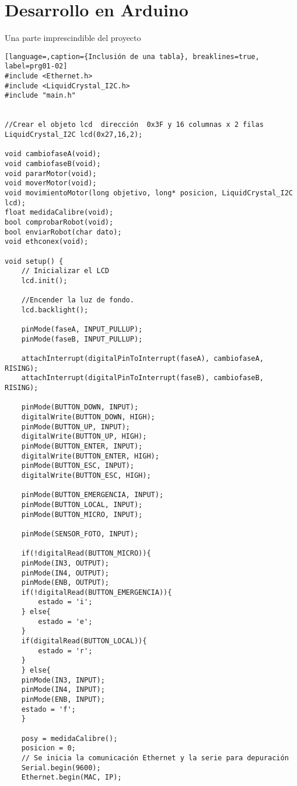 \chapter{Desarrollo en Arduino}\label{chp-05}

Una parte imprescindible del proyecto 


\begin{lstlisting}[language=,caption={Inclusión de una tabla}, breaklines=true, label=prg01-02]
#include <Ethernet.h>
#include <LiquidCrystal_I2C.h>
#include "main.h"


//Crear el objeto lcd  dirección  0x3F y 16 columnas x 2 filas
LiquidCrystal_I2C lcd(0x27,16,2);

void cambiofaseA(void);
void cambiofaseB(void);
void pararMotor(void);
void moverMotor(void);
void movimientoMotor(long objetivo, long* posicion, LiquidCrystal_I2C lcd);
float medidaCalibre(void);
bool comprobarRobot(void);
bool enviarRobot(char dato);
void ethconex(void);

void setup() {
    // Inicializar el LCD
    lcd.init();
    
    //Encender la luz de fondo.
    lcd.backlight();
    
    pinMode(faseA, INPUT_PULLUP);
    pinMode(faseB, INPUT_PULLUP);

    attachInterrupt(digitalPinToInterrupt(faseA), cambiofaseA, RISING);
    attachInterrupt(digitalPinToInterrupt(faseB), cambiofaseB, RISING);

    pinMode(BUTTON_DOWN, INPUT);
    digitalWrite(BUTTON_DOWN, HIGH);
    pinMode(BUTTON_UP, INPUT);
    digitalWrite(BUTTON_UP, HIGH);
    pinMode(BUTTON_ENTER, INPUT);
    digitalWrite(BUTTON_ENTER, HIGH);
    pinMode(BUTTON_ESC, INPUT);
    digitalWrite(BUTTON_ESC, HIGH);

    pinMode(BUTTON_EMERGENCIA, INPUT);
    pinMode(BUTTON_LOCAL, INPUT);
    pinMode(BUTTON_MICRO, INPUT);

    pinMode(SENSOR_FOTO, INPUT);

    if(!digitalRead(BUTTON_MICRO)){
    pinMode(IN3, OUTPUT);
    pinMode(IN4, OUTPUT);
    pinMode(ENB, OUTPUT);
    if(!digitalRead(BUTTON_EMERGENCIA)){
        estado = 'i';
    } else{
        estado = 'e';
    }
    if(digitalRead(BUTTON_LOCAL)){
        estado = 'r';
    }
    } else{
    pinMode(IN3, INPUT);
    pinMode(IN4, INPUT);
    pinMode(ENB, INPUT);
    estado = 'f';
    }

    posy = medidaCalibre();
    posicion = 0;
    // Se inicia la comunicación Ethernet y la serie para depuración
    Serial.begin(9600);
    Ethernet.begin(MAC, IP);


\end{lstlisting}
